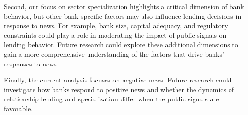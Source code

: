 Second, our focus on sector specialization highlights a critical dimension of bank behavior, but other bank-specific factors may also influence lending decisions in response to news. For example, bank size, capital adequacy, and regulatory constraints could play a role in moderating the impact of public signals on lending behavior. Future research could explore these additional dimensions to gain a more comprehensive understanding of the factors that drive banks' responses to news.

Finally, the current analysis focuses on negative news. Future research could investigate how banks respond to positive news and whether the dynamics of relationship lending and specialization differ when the public signals are favorable.

